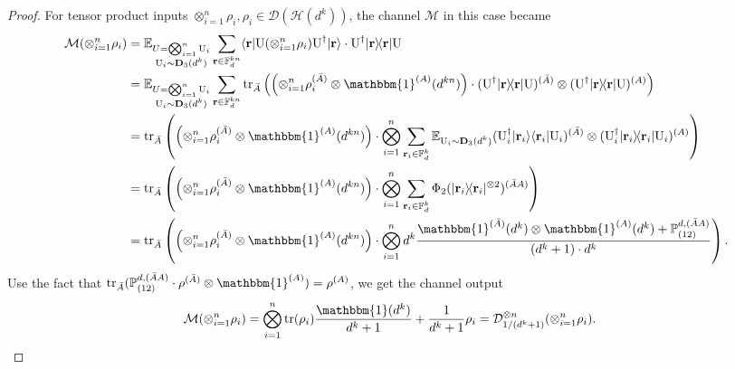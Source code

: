 \documentclass[aps,%
twocolumn,%
floatfix,%
pra,%
amsfonts,%
groupedaddress,%
superscriptaddress]{revtex4-2}%
\newcommand{\bra}[1]{\langle #1\rvert}
\newcommand{\ket}[1]{\lvert #1\rangle}
\newcommand{\1}{\mathbbm{1}}
\begin{document}
\begin{proof}
    For tensor product inputs $\otimes_{i = 1}^n \rho_i, \rho_i \in \mathcal{D}(\mathcal{H}(d^k))$, the channel $\mathcal{M}$ in this case became
\begin{align}
    \mathcal{M}(\otimes_{i = 1}^n \rho_i) 
    &=\mathbb{E}_{\substack{U = \bigotimes_{i=1}^n\text{U}_i \\ \text{U}_i \sim \mathbf{D}_{3}(d^k)}} \sum_{\mathbf{r} \in \mathbb{F}_d^{kn}} \bra{{\mathbf r}} \text{U} (\otimes_{i = 1}^n \rho_i) \text{U}^{\dagger} \ket{{\mathbf r}} \cdot \text{U}^{\dagger} \ket{{\mathbf r}}\!\bra{{\mathbf r}} \text{U} \notag\\
    &=\mathbb{E}_{\substack{U = \bigotimes_{i=1}^n\text{U}_i \\ \text{U}_i \sim \mathbf{D}_{3}(d^k)}} \sum_{\mathbf{r} \in \mathbb{F}_d^{kn}} \text{tr}_{\bar A} \left( \left(\otimes_{i = 1}^n \rho_i^{(\bar A)} \otimes \1^{(A)}(d^{kn})\right)\cdot  (\text{U}^{\dagger} \ket{{\mathbf r}}\! \bra{{\mathbf r}} \text{U})^{(\bar A)} \otimes (\text{U}^{\dagger} \ket{{\mathbf r}}\!\bra{{\mathbf r}} \text{U})^{(A)} \right)\notag\\
    &= \text{tr}_{\bar A}\left( \left(\otimes_{i = 1}^n \rho_i^{(\bar A)}\otimes \1^{(A)}(d^{kn})\right) \cdot \bigotimes_{i = 1}^n \sum_{\mathbf{r}_i \in \mathbb{F}_d^k} \mathbb{E}_{\substack{\text{U}_i \sim \mathbf{D}_{3}(d^k)}}  (\text{U}_i^{\dagger} \ket{\mathbf{r}_{i}}\bra{\mathbf{r}_{i}} \text{U}_i)^{(\bar A)} \otimes (\text{U}_i^{\dagger} \ket{\mathbf{r}_{i}}\!\bra{\mathbf{r}_{i}} \text{U}_i)^{(A)} \right)\notag\\
    &=  \text{tr}_{\bar A}\left( \left(\otimes_{i = 1}^n \rho_i^{(\bar A)}\otimes \1^{(A)}(d^{kn})\right) \cdot \bigotimes_{i = 1}^n \sum_{\mathbf{r}_{i}\in \mathbb{F}_d^{k}} \Phi_2(\ket{\mathbf{r}_{i}}\!\bra{\mathbf{r}_{i}}^{\otimes 2})^{(\bar A A)} \right)\notag \\
    &= \text{tr}_{\bar A}\left( \left(\otimes_{i = 1}^n \rho_i^{(\bar A)}\otimes \1^{(A)}(d^{kn})\right) \cdot \bigotimes_{i = 1}^n d^{k} \frac{\1^{(\bar A)}(d^k)\otimes \1^{(A)}(d^k)+ \mathbb{P}_{(12)}^{d,(\bar A A)}}{(d^k+1) \cdot d^k}\right).\label{eq:k_copy_shadow_channel}
\end{align}
Use the fact that  $\text{tr}_{\bar A}(\mathbb{P}_{(12)}^{d,(\bar A A)}\cdot \rho^{(\bar A)}\otimes \1^{(A)}) = \rho^{(A)}$, we get the channel output
\begin{align}
    \mathcal{M}(\otimes_{i = 1}^n \rho_i) 
    &= \bigotimes_{i = 1}^n \text{tr}(\rho_i) \frac{\1(d^k)}{d^k + 1} + \frac{1}{d^k +1}\rho_i = \mathcal{D}^{\otimes n}_{{1}/{(d^k +1)}}(\otimes_{i = 1}^n \rho_i).

\end{align}
\end{proof}
\end{document}
